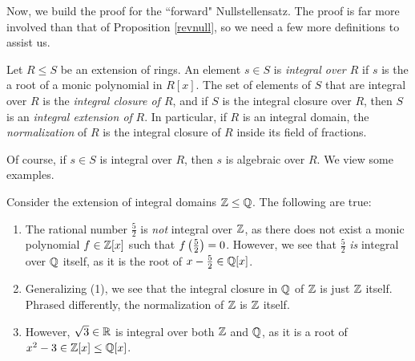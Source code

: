 \documentclass{article}
\begin{document}
Now, we build the proof for the ``forward" Nullstellensatz. The proof is far more involved than that of Proposition \ref{revnull}, so we need a few more definitions to assist us.

\begin{definition}\label{integrality}
Let $R\leq S$ be an extension of rings. An element $s\in S$ is \textit{integral over $R$} if $s$ is the a root of a monic polynomial in $R[x]$. The set of elements of $S$ that are integral over $R$ is the \textit{integral closure of $R$}, and if $S$ is the integral closure over $R$, then $S$ is an \textit{integral extension of} $R$. In particular, if $R$ is an integral domain, the \textit{normalization} of $R$ is the integral closure of $R$ inside its field of fractions.
\end{definition}

Of course, if $s\in S$ is integral over $R$, then $s$ is algebraic over $R$. We view some examples.

\begin{example}
Consider the extension of integral domains $\mathbb Z\leq\mathbb Q$. The following are true:
\begin{enumerate}
    \item The rational number $\frac 52$ is \textit{not} integral over $\mathbb Z$, as there does not exist a monic polynomial $f\in \mathbb Z[x]$ such that $f\left(\frac 52 \right) = 0$. However, we see that $\frac 52$ \textit{is} integral over $\mathbb Q$ itself, as it is the root of $x - \frac 52 \in \mathbb Q[x]$.
    \item Generalizing (1), we see that the integral closure in $\mathbb Q$ of $\mathbb Z$ is just $\mathbb Z$ itself. Phrased differently, the normalization of $\mathbb Z$ is $\mathbb Z$ itself.
    \item However, $\sqrt 3\in \mathbb R$ is integral over both $\mathbb Z$ and $\mathbb Q$, as it is a root of $x^2 -3 \in \mathbb Z[x]\leq \mathbb Q[x]$.
\end{enumerate}
\end{example}
\end{document}
